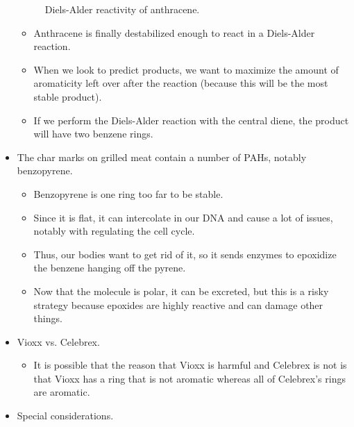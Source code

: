 \documentclass[../notes.tex]{subfiles}
\begin{document}
\begin{itemize}
\begin{figure}[h!]
        \caption{Diels-Alder reactivity of anthracene.}
        \label{fig:dielsAlderAnthracene}
    \end{figure}
    \begin{itemize}
        \item Anthracene is finally destabilized enough to react in a Diels-Alder reaction.
        \item When we look to predict products, we want to maximize the amount of aromaticity left over after the reaction (because this will be the most stable product).
        \item If we perform the Diels-Alder reaction with the central diene, the product will have two benzene rings.
    \end{itemize}
    \item The char marks on grilled meat contain a number of PAHs, notably benzopyrene.
    \begin{itemize}
        \item Benzopyrene is one ring too far to be stable.
        \item Since it is flat, it can intercolate in our DNA and cause a lot of issues, notably with regulating the cell cycle.
        \item Thus, our bodies want to get rid of it, so it sends enzymes to epoxidize the benzene hanging off the pyrene.
        \item Now that the molecule is polar, it can be excreted, but this is a risky strategy because epoxides are highly reactive and can damage other things.
    \end{itemize}
    \item Vioxx vs. Celebrex.
    \begin{itemize}
        \item It is possible that the reason that Vioxx is harmful and Celebrex is not is that Vioxx has a ring that is not aromatic whereas all of Celebrex's rings are aromatic.
    \end{itemize}
    \item Special considerations.
    \begin{figure}[H]
        \centering
        \footnotesize
        \begin{subfigure}[b]{0.3\linewidth}

\end{subfigure}
\end{figure}
\end{itemize}
\end{document}
